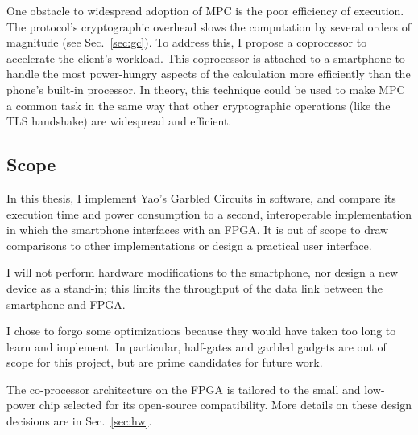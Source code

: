 One obstacle to widespread adoption of MPC is the poor efficiency of execution. The protocol's cryptographic overhead slows the computation by several orders of magnitude (see Sec.~\ref{sec:gc}). To address this, I propose a coprocessor to accelerate the client's workload. This coprocessor is attached to a smartphone to handle the most power-hungry aspects of the calculation more efficiently than the phone's built-in processor. In theory, this technique could be used to make MPC a common task in the same way that other cryptographic operations (like the TLS handshake) are widespread and efficient.

\subsection{Scope}
In this thesis, I implement Yao's Garbled Circuits in software, and compare its execution time and power consumption to a second, interoperable implementation in which the smartphone interfaces with an FPGA\@. It is out of scope to draw comparisons to other implementations or design a practical user interface.

I will not perform hardware modifications to the smartphone, nor design a new device as a stand-in; this limits the throughput of the data link between the smartphone and FPGA.

I chose to forgo some optimizations because they would have taken too long to learn and implement. In particular, half-gates and garbled gadgets are out of scope for this project, but are prime candidates for future work.

The co-processor architecture on the FPGA is tailored to the small and low-power chip selected for its open-source\cite{IceStorm} compatibility. More details on these design decisions are in Sec.~\ref{sec:hw}.
